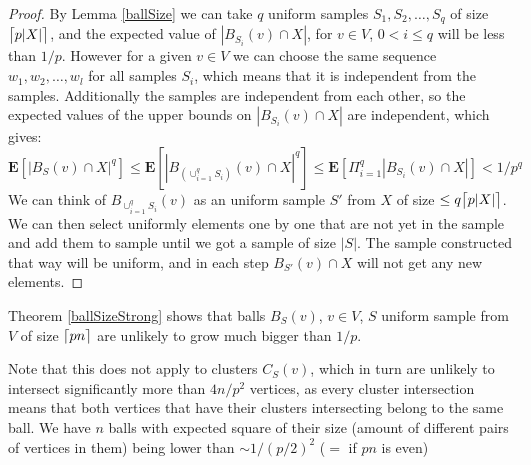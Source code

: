 \documentclass[shortabstract, lic, english]{iithesis}
\theoremstyle{definition} \newtheorem{definition}{Definition}[chapter]
\theoremstyle{plain} \newtheorem{remark}[definition]{Observation}
\theoremstyle{plain} \newtheorem{theorem}[definition]{Theorem}
\theoremstyle{plain} \newtheorem{lemma}[definition]{Lemma}
\theoremstyle{plain} \newtheorem{conjecture}[definition]{Conjecture}
\DeclarePairedDelimiter{\ceil}{\lceil}{\rceil}
\begin{document}
\begin{proof}
    By Lemma \ref{ballSize} we can take $q$ uniform samples $S_1, S_2, \ldots, S_q$ of size $\ceil[\big]{p |X|}$,
    and the expected value of $|B_{S_i}(v) \cap X|$, for $v \in V$, $0 < i \leq q$ will be less than $1/p$.
    However for a given $v \in V$ we can choose the same sequence $w_1, w_2, \ldots, w_l$ for all samples $S_i$,
    which means that it is independent from the samples. Additionally the samples are independent from each other,
    so the expected values of the upper bounds on $|B_{S_i}(v) \cap X|$ are independent, which gives:
    $$\mathbf{E}[|B_{S}(v) \cap X|^q] \leq \mathbf{E}[|B_{(\cup_{i = 1}^{q} S_i)}(v) \cap X|^q] \leq \mathbf{E}[\Pi_{i = 1}^{q} |B_{S_i}(v) \cap X|] < 1/p^q$$
    We can think of $B_{\cup_{i = 1}^{q} S_i}(v)$ as an uniform sample $S'$ from $X$ of size $\leq q\ceil[\big]{p|X|}$.
    We can then select uniformly elements one by one that are not yet in the sample and add them to sample until we got a sample of size $|S|$.
    The sample constructed that way will be uniform, and in each step $B_{S'}(v) \cap X$ will not get any new elements.
\end{proof}

Theorem \ref{ballSizeStrong} shows that balls $B_S(v)$, $v \in V$, $S$ uniform sample from $V$ of size $\ceil{pn}$ are unlikely to grow much bigger than $1/p$.

Note that this does not apply to clusters $C_S(v)$, which in turn are unlikely to intersect significantly more than $4n/p^2$ vertices,
as every cluster intersection means that both vertices that have their clusters intersecting belong to the same ball.
We have $n$ balls with expected square of their size (amount of different pairs of vertices in them) being lower than $\sim 1/(p/2)^2$ ($=$ if $p n$ is even)
\end{document}
